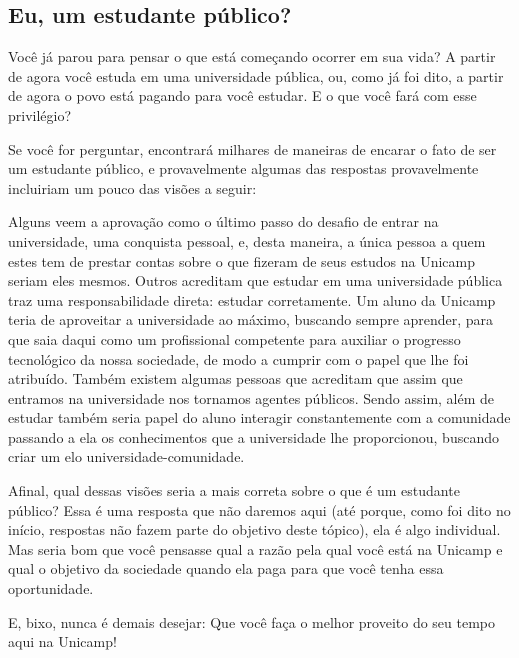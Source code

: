 \subsection{Eu, um estudante público?}

Você já parou para pensar o que está começando ocorrer em sua vida? A partir de
agora você estuda em uma universidade pública, ou, como já foi dito, a partir de
agora o povo está pagando para você estudar. E o que você fará com esse
privilégio?

Se você for perguntar, encontrará milhares de maneiras de encarar o fato de ser
um estudante público, e provavelmente algumas das respostas provavelmente
incluiriam um pouco das visões a seguir:

Alguns veem a aprovação como o último passo do desafio de entrar na
universidade, uma conquista pessoal, e, desta maneira, a única pessoa a quem
estes tem de prestar contas sobre o que fizeram de seus estudos na Unicamp
seriam eles mesmos. Outros acreditam que estudar em uma universidade pública
traz uma responsabilidade direta: estudar corretamente. Um aluno da Unicamp
teria de aproveitar a universidade ao máximo, buscando sempre aprender, para que
saia daqui como um profissional competente para auxiliar o progresso tecnológico
da nossa sociedade, de modo a cumprir com o papel que lhe foi atribuído. Também
existem algumas pessoas que acreditam que assim que entramos na universidade nos
tornamos agentes públicos. Sendo assim, além de estudar também seria papel do
aluno interagir constantemente com a comunidade passando a ela os conhecimentos
que a universidade lhe proporcionou, buscando criar um elo
universidade-comunidade.

Afinal, qual dessas visões seria a mais correta sobre o que é um estudante
público? Essa é uma resposta que não daremos aqui (até porque, como foi dito no
início, respostas não fazem parte do objetivo deste tópico), ela é algo
individual. Mas seria bom que você pensasse qual a razão pela qual você está na
Unicamp e qual o objetivo da sociedade quando ela paga para que você tenha essa
oportunidade.

E, bixo, nunca é demais desejar: Que você faça o melhor proveito do seu tempo
aqui na Unicamp!

